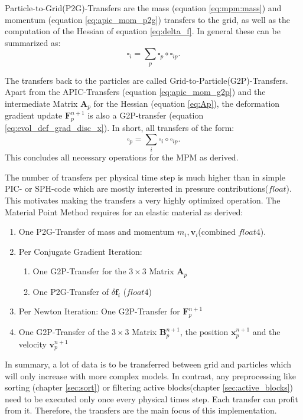 \documentclass[m,times]{cgMA}
\begin{document}
Particle-to-Grid(P2G)-Transfers are the mass (equation \ref{eq:mpm:mass}) and momentum (equation \ref{eq:apic_mom_p2g}) transfers to the grid, as well as the computation of the Hessian of equation \ref{eq:delta_f}. In general these can be summarized as:
$$\square_i = \sum_p \square_p \circ \square_{ip}.$$

The transfers back to the particles are called Grid-to-Particle(G2P)-Transfers. Apart from the APIC-Transfers (equation \ref{eq:apic_mom_g2p}) and the intermediate Matrix $\boldsymbol{A}_p$ for the Hessian (equation \ref{eq:Ap}), the deformation gradient update $\boldsymbol{F}^{n+1}_p$ is also a G2P-transfer (equation \ref{eq:evol_def_grad_disc_x}). In short, all transfers of the form:
$$\square_p = \sum_i \square_i \circ \square_{ip}.$$
This concludes all necessary operations for the MPM as derived.

The number of transfers per physical time step is much higher than in simple PIC- or SPH-code which are mostly interested in pressure contributions($float$). This motivates making the transfers a very highly optimized operation. The Material Point Method requires for an elastic material as derived:
\begin{enumerate}
  \item One P2G-Transfer of mass and momentum $m_i, \boldsymbol{v}_i$(combined $float4$).
  \item Per Conjugate Gradient Iteration:
    \begin{enumerate}
      \item One G2P-Transfer for the $3 \times 3$ Matrix $\boldsymbol{A}_p$
      \item One P2G-Transfer of $\delta \boldsymbol{f}_i$ ($float4$)
    \end{enumerate}
  \item Per Newton Iteration: One G2P-Transfer for $\boldsymbol{F}^{n+1}_p$
  \item One G2P-Transfer of the $3 \times 3$ Matrix $\boldsymbol{B}_p^{n+1}$, the position $\boldsymbol{x}_p^{n+1}$ and the velocity $\boldsymbol{v}_p^{n+1}$
\end{enumerate}
In summary, a lot of data is to be transferred between grid and particles which will only increase with more complex models. In contrast, any preprocessing like sorting (chapter \ref{sec:sort}) or filtering active blocks(chapter \ref{sec:active_blocks}) need to be executed only once every physical times step. Each transfer can profit from it. Therefore, the transfers are the main focus of this implementation.
\end{document}
